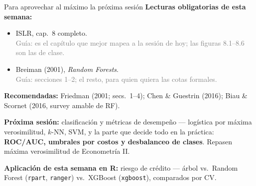 \documentclass{beamer}
\newcommand{\1}{\mathbb{I}}
\begin{document}
\begin{frame}{Para aprovechar al máximo la próxima sesión}
\small
\textbf{Lecturas obligatorias de esta semana:}
\begin{itemize}\itemsep4pt
  \item ISLR, cap.\ 8 completo. \\ \textcolor{gray}{Guía: es el capítulo que mejor mapea a la sesión de hoy; las figuras 8.1--8.6 son las de clase.}
  \item Breiman (2001), \emph{Random Forests}. \\ \textcolor{gray}{Guía: secciones 1--2; el resto, para quien quiera las cotas formales.}
\end{itemize}

\textbf{Recomendadas:} Friedman (2001; secs.\ 1--4); Chen \& Guestrin (2016); Biau \& Scornet (2016, survey amable de RF).
\pause

\vspace{0.2cm}
\textbf{Próxima sesión:} clasificación y métricas de desempeño --- logística por máxima verosimilitud, $k$-NN, SVM, y la parte que decide todo en la práctica: \textbf{ROC/AUC, umbrales por costos y desbalanceo de clases}. Repasen máxima verosimilitud de Econometría II.
\pause

\vspace{0.2cm}
\textbf{Aplicación de esta semana en R:} riesgo de crédito --- árbol vs.\ Random Forest (\texttt{rpart}, \texttt{ranger}) vs.\ XGBoost (\texttt{xgboost}), comparados por CV.
\end{frame}
\end{document}
